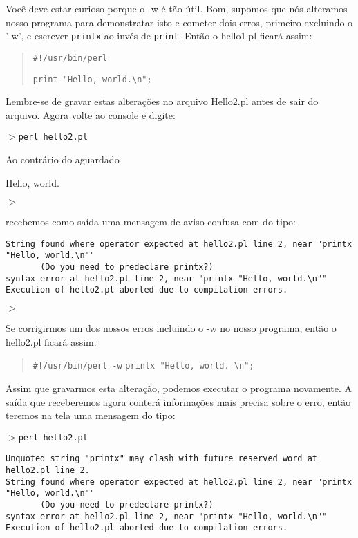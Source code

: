 \documentclass[a4paper,12pt,twoside]{book}
\newenvironment{code}{\begin{quote}}{\end{quote}}
\begin{document}
\noindent Você deve estar curioso porque o -w é tão útil. Bom, supomos que nós 
alteramos nosso programa para demonstratar isto e cometer dois erros,
primeiro excluindo o '-w', e escrever \texttt{printx} ao invés de \texttt{print}. 
Então o hello1.pl ficará assim: 

  \begin{code}
  \texttt{\#!/usr/bin/perl}

  \texttt{print "Hello, world.\textbackslash n";}
  \end{code}

\noindent Lembre-se de gravar estas alterações no arquivo Hello2.pl antes
de sair do arquivo. Agora volte ao console e digite:\medskip

\noindent $>$\texttt{perl hello2.pl}\medskip

\noindent Ao contrário do aguardado\medskip

\noindent Hello, world.

\noindent $>$\medskip

\noindent recebemos como saída uma mensagem de aviso confusa com do tipo:
\begin{verbatim}
String found where operator expected at hello2.pl line 2, near "printx "Hello, world.\n""                                                                                                              
       (Do you need to predeclare printx?)
syntax error at hello2.pl line 2, near "printx "Hello, world.\n""
Execution of hello2.pl aborted due to compilation errors.
\end{verbatim}

\noindent $>$\medskip

\noindent Se corrigirmos um dos nossos erros incluindo o -w no nosso programa, então o hello2.pl ficará assim:\medskip

\begin{code}
  \texttt{\#!/usr/bin/perl -w}\medskip
  \texttt{printx "Hello, world. \textbackslash n";}\medskip
\end{code}

\noindent Assim que gravarmos esta alteração, podemos executar o programa novamente. 
A saída que receberemos agora conterá informações mais precisa sobre o erro, 
então teremos na tela uma mensagem do tipo:\medskip

\noindent $>$\texttt{perl hello2.pl}\medskip

\begin{verbatim}
Unquoted string "printx" may clash with future reserved word at hello2.pl line 2.
String found where operator expected at hello2.pl line 2, near "printx "Hello, world.\n""
       (Do you need to predeclare printx?)
syntax error at hello2.pl line 2, near "printx "Hello, world.\n""
Execution of hello2.pl aborted due to compilation errors.
\end{verbatim}
\end{document}
